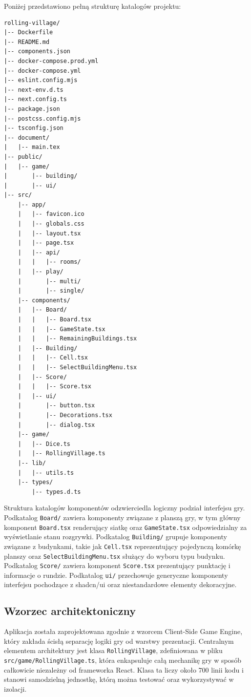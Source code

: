 \documentclass[12pt, a4paper]{article}
\begin{document}
Poniżej przedstawiono pełną strukturę katalogów projektu:

\begin{lstlisting}[caption={Struktura katalogów projektu}, label={lst:structure}]
rolling-village/
|-- Dockerfile
|-- README.md
|-- components.json
|-- docker-compose.prod.yml
|-- docker-compose.yml
|-- eslint.config.mjs
|-- next-env.d.ts
|-- next.config.ts
|-- package.json
|-- postcss.config.mjs
|-- tsconfig.json
|-- document/
|   |-- main.tex
|-- public/
|   |-- game/
|       |-- building/
|       |-- ui/
|-- src/
    |-- app/
    |   |-- favicon.ico
    |   |-- globals.css
    |   |-- layout.tsx
    |   |-- page.tsx
    |   |-- api/
    |   |   |-- rooms/
    |   |-- play/
    |       |-- multi/
    |       |-- single/
    |-- components/
    |   |-- Board/
    |   |   |-- Board.tsx
    |   |   |-- GameState.tsx
    |   |   |-- RemainingBuildings.tsx
    |   |-- Building/
    |   |   |-- Cell.tsx
    |   |   |-- SelectBuildingMenu.tsx
    |   |-- Score/
    |   |   |-- Score.tsx
    |   |-- ui/
    |       |-- button.tsx
    |       |-- Decorations.tsx
    |       |-- dialog.tsx
    |-- game/
    |   |-- Dice.ts
    |   |-- RollingVillage.ts
    |-- lib/
    |   |-- utils.ts
    |-- types/
        |-- types.d.ts
\end{lstlisting}

Struktura katalogów komponentów odzwierciedla logiczny podział interfejsu gry. Podkatalog \texttt{Board/} zawiera komponenty związane z planszą gry, w tym główny komponent \texttt{Board.tsx} renderujący siatkę oraz \texttt{GameState.tsx} odpowiedzialny za wyświetlanie stanu rozgrywki. Podkatalog \texttt{Building/} grupuje komponenty związane z budynkami, takie jak \texttt{Cell.tsx} reprezentujący pojedynczą komórkę planszy oraz \texttt{SelectBuildingMenu.tsx} służący do wyboru typu budynku. Podkatalog \texttt{Score/} zawiera komponent \texttt{Score.tsx} prezentujący punktację i informacje o rundzie. Podkatalog \texttt{ui/} przechowuje generyczne komponenty interfejsu pochodzące z shadcn/ui oraz niestandardowe elementy dekoracyjne.

\subsection{Wzorzec architektoniczny}

Aplikacja została zaprojektowana zgodnie z wzorcem Client-Side Game Engine, który zakłada ścisłą separację logiki gry od warstwy prezentacji. Centralnym elementem architektury jest klasa \texttt{RollingVillage}, zdefiniowana w pliku \texttt{src/game/RollingVillage.ts}, która enkapsuluje całą mechanikę gry w sposób całkowicie niezależny od frameworka React. Klasa ta liczy około 700 linii kodu i stanowi samodzielną jednostkę, którą można testować oraz wykorzystywać w izolacji.
\end{document}
